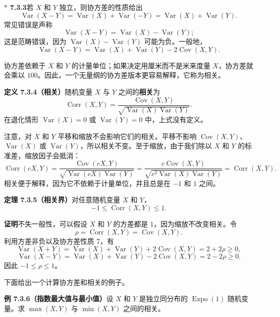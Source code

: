 \documentclass[UTF8, 12pt, fontset=fandol, oneside]{ctexart}
\newcommand{\biohazard}{\ensuremath{\ast}}
\begin{document}
\noindent\textbf{$\biohazard$ 7.3.3}\quad 若 $X$ 和 $Y$ 独立，则协方差的性质给出
\[
  \operatorname{Var}(X-Y)=\operatorname{Var}(X)+\operatorname{Var}(-Y)
  =\operatorname{Var}(X)+\operatorname{Var}(Y).
\]
常见错误是声称
\[
  \operatorname{Var}(X-Y)=\operatorname{Var}(X)-\operatorname{Var}(Y);
\]
这是范畴错误，因为 $\operatorname{Var}(X)-\operatorname{Var}(Y)$ 可能为负。一般地，
\[
  \operatorname{Var}(X-Y)=\operatorname{Var}(X)+\operatorname{Var}(Y)-2\operatorname{Cov}(X,Y).
\]

协方差依赖于 $X$ 和 $Y$ 的计量单位；如果决定用厘米而不是米来度量 $X$，协方差就会乘以 $100$。因此，一个无量纲的协方差版本更容易解释，它称为相关。

\noindent\textbf{定义 7.3.4（相关）}\quad 随机变量 $X$ 与 $Y$ 之间的\textbf{相关}为
\[
  \operatorname{Corr}(X,Y)
  =\frac{\operatorname{Cov}(X,Y)}
  {\sqrt{\operatorname{Var}(X)\operatorname{Var}(Y)}}.
\]
在退化情形 $\operatorname{Var}(X)=0$ 或 $\operatorname{Var}(Y)=0$ 中，上式没有定义。

注意，对 $X$ 和 $Y$ 平移和缩放不会影响它们的相关。平移不影响 $\operatorname{Cov}(X,Y)$、$\operatorname{Var}(X)$ 或 $\operatorname{Var}(Y)$，所以相关不变。至于缩放，由于我们除以 $X$ 和 $Y$ 的标准差，缩放因子会抵消：
\[
  \operatorname{Corr}(cX,Y)
  =\frac{\operatorname{Cov}(cX,Y)}
  {\sqrt{\operatorname{Var}(cX)\operatorname{Var}(Y)}}
  =\frac{c\operatorname{Cov}(X,Y)}
  {\sqrt{c^2\operatorname{Var}(X)\operatorname{Var}(Y)}}
  =\operatorname{Corr}(X,Y).
\]
相关便于解释，因为它不依赖于计量单位，并且总是在 $-1$ 和 $1$ 之间。

\noindent\textbf{定理 7.3.5（相关界）}\quad 对任意随机变量 $X$ 和 $Y$，
\[
  -1\le \operatorname{Corr}(X,Y)\le 1.
\]

\noindent\textbf{证明}\quad 不失一般性，可以假设 $X$ 和 $Y$ 的方差都是 $1$，因为缩放不改变相关。令
\[
  \rho=\operatorname{Corr}(X,Y)=\operatorname{Cov}(X,Y).
\]
利用方差非负以及协方差性质 7，有
\[
  \operatorname{Var}(X+Y)
  =\operatorname{Var}(X)+\operatorname{Var}(Y)+2\operatorname{Cov}(X,Y)
  =2+2\rho\ge 0,
\]
\[
  \operatorname{Var}(X-Y)
  =\operatorname{Var}(X)+\operatorname{Var}(Y)-2\operatorname{Cov}(X,Y)
  =2-2\rho\ge 0.
\]
因此 $-1\le \rho\le 1$。

下面给出一个计算协方差和相关的例子。

\noindent\textbf{例 7.3.6（指数最大值与最小值）}\quad 设 $X$ 和 $Y$ 是独立同分布的 $\operatorname{Expo}(1)$ 随机变量。求 $\max(X,Y)$ 与 $\min(X,Y)$ 之间的相关。
\end{document}
